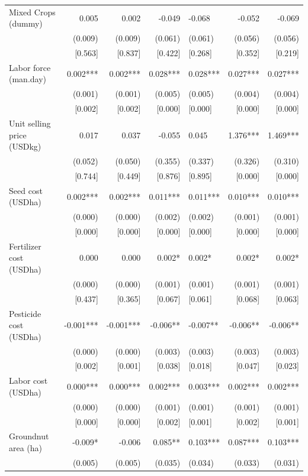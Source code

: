 \documentclass[
]{article}
\begin{document}
\begin{landscape}
\begin{ThreePartTable}
\begin{longtable}[t]{lrrrlrr}
Mixed Crops (dummy) & 0.005 & 0.002 & -0.049 & -0.068 & -0.052 & -0.069\\
 & (0.009) & (0.009) & (0.061) & (0.061) & (0.056) & (0.056)\\
 & {}[0.563] & {}[0.837] & {}[0.422] & {}[0.268] & {}[0.352] & {}[0.219]\\
Labor force (man.day) & 0.002*** & 0.002*** & 0.028*** & 0.028*** & 0.027*** & 0.027***\\
 & (0.001) & (0.001) & (0.005) & (0.005) & (0.004) & (0.004)\\
 & {}[0.002] & {}[0.002] & {}[0.000] & {}[0.000] & {}[0.000] & {}[0.000]\\
Unit selling price (USD\/kg) & 0.017 & 0.037 & -0.055 & 0.045 & 1.376*** & 1.469***\\
 & (0.052) & (0.050) & (0.355) & (0.337) & (0.326) & (0.310)\\
 & {}[0.744] & {}[0.449] & {}[0.876] & {}[0.895] & {}[0.000] & {}[0.000]\\
Seed cost (USD\/ha) & 0.002*** & 0.002*** & 0.011*** & 0.011*** & 0.010*** & 0.010***\\
 & (0.000) & (0.000) & (0.002) & (0.002) & (0.001) & (0.001)\\
 & {}[0.000] & {}[0.000] & {}[0.000] & {}[0.000] & {}[0.000] & {}[0.000]\\
Fertilizer cost (USD\/ha) & 0.000 & 0.000 & 0.002* & 0.002* & 0.002* & 0.002*\\
 & (0.000) & (0.000) & (0.001) & (0.001) & (0.001) & (0.001)\\
 & {}[0.437] & {}[0.365] & {}[0.067] & {}[0.061] & {}[0.068] & {}[0.063]\\
Pesticide cost (USD\/ha) & -0.001*** & -0.001*** & -0.006** & -0.007** & -0.006** & -0.006**\\
 & (0.000) & (0.000) & (0.003) & (0.003) & (0.003) & (0.003)\\
 & {}[0.002] & {}[0.001] & {}[0.038] & {}[0.018] & {}[0.047] & {}[0.023]\\
Labor cost (USD\/ha) & 0.000*** & 0.000*** & 0.002*** & 0.003*** & 0.002*** & 0.002***\\
 & (0.000) & (0.000) & (0.001) & (0.001) & (0.001) & (0.001)\\
 & {}[0.000] & {}[0.000] & {}[0.002] & {}[0.001] & {}[0.002] & {}[0.001]\\
Groundnut area (ha) & -0.009* & -0.006 & 0.085** & 0.103*** & 0.087*** & 0.103***\\
 & (0.005) & (0.005) & (0.035) & (0.034) & (0.033) & (0.031)\\

\end{longtable}
\end{ThreePartTable}
\end{landscape}
\end{document}
